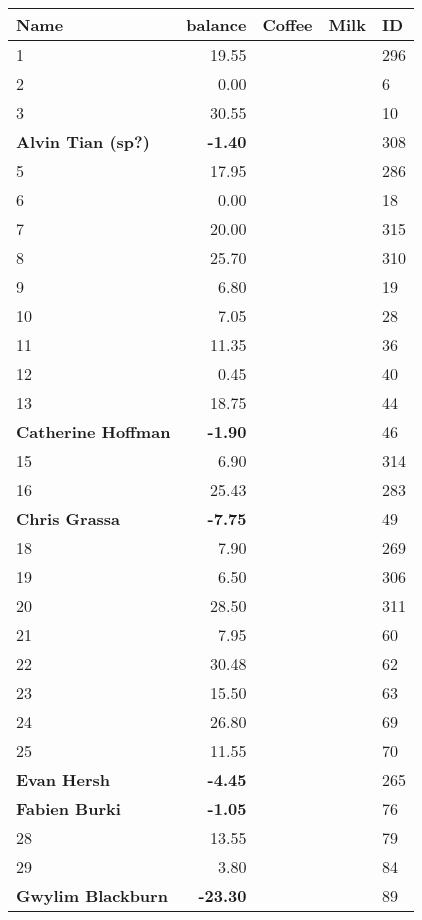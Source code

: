 \begin{longtable}{|p{5cm}|r|p{9cm}|p{6cm}|l|}
 Name & balance & \textbf{Coffee} & \textbf{Milk} & ID \\ 
  \hline \endhead 1 & 19.55 &  &  & 296 \\ 
   \hline
2 & 0.00 &  &  &   6 \\ 
   \hline
3 & 30.55 &  &  &  10 \\ 
   \hline
\textbf{Alvin Tian (sp?)} & \textbf{-1.40} &  &  & 308 \\ 
   \hline
5 & 17.95 &  &  & 286 \\ 
   \hline
6 & 0.00 &  &  &  18 \\ 
   \hline
7 & 20.00 &  &  & 315 \\ 
   \hline
8 & 25.70 &  &  & 310 \\ 
   \hline
9 & 6.80 &  &  &  19 \\ 
   \hline
10 & 7.05 &  &  &  28 \\ 
   \hline
11 & 11.35 &  &  &  36 \\ 
   \hline
12 & 0.45 &  &  &  40 \\ 
   \hline
13 & 18.75 &  &  &  44 \\ 
   \hline
\textbf{Catherine Hoffman} & \textbf{-1.90} &  &  &  46 \\ 
   \hline
15 & 6.90 &  &  & 314 \\ 
   \hline
16 & 25.43 &  &  & 283 \\ 
   \hline
\textbf{Chris Grassa} & \textbf{-7.75} &  &  &  49 \\ 
   \hline
18 & 7.90 &  &  & 269 \\ 
   \hline
19 & 6.50 &  &  & 306 \\ 
   \hline
20 & 28.50 &  &  & 311 \\ 
   \hline
21 & 7.95 &  &  &  60 \\ 
   \hline
22 & 30.48 &  &  &  62 \\ 
   \hline
23 & 15.50 &  &  &  63 \\ 
   \hline
24 & 26.80 &  &  &  69 \\ 
   \hline
25 & 11.55 &  &  &  70 \\ 
   \hline
\textbf{Evan Hersh} & \textbf{-4.45} &  &  & 265 \\ 
   \hline
\textbf{Fabien Burki} & \textbf{-1.05} &  &  &  76 \\ 
   \hline
28 & 13.55 &  &  &  79 \\ 
   \hline
29 & 3.80 &  &  &  84 \\ 
   \hline
\textbf{Gwylim Blackburn} & \textbf{-23.30} &  &  &  89 \\ 

\end{longtable}
